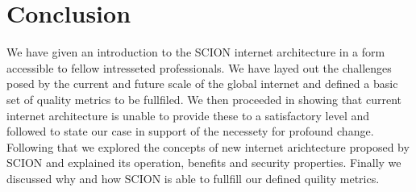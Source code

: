 \documentclass[../eva1_scion.tex]{subfiles}
\begin{document}
    \chapter{Conclusion}\label{ch:conlusion}
    We have given an introduction to the SCION internet architecture in a form accessible to fellow intresseted professionals. We have layed out the challenges posed by the current and future scale of the global internet and defined a basic set of quality metrics to be fullfiled. We then proceeded in showing that current internet architecture is unable to provide these to a satisfactory level and followed to state our case in support of the necessety for profound change. Following that we explored the concepts of new internet arichtecture proposed by SCION and explained its operation, benefits and security properties. Finally we discussed why and how SCION is able to fullfill our defined quility metrics.
\end{document}
